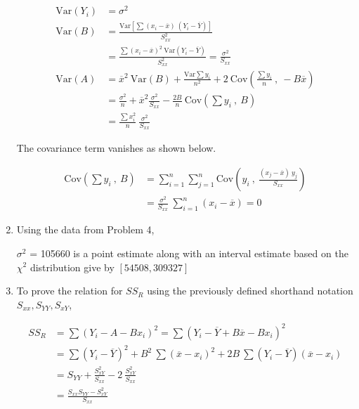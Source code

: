 \begin{enumerate}
\begin{align}
	\mathrm{Var}(Y_i) &= \sigma^2 \nonumber \\
	\mathrm{Var}(B) &= \frac{\mathrm{Var}\left[\sum (x_i - \overline{x})\ (Y_i - \overline{Y})\right]}{S_{xx}^2} \nonumber \\
	&= \frac{\sum (x_i - \overline{x})^2\ \mathrm{Var}(Y_i - \overline{Y})}{S_{xx}^2} = \frac{\sigma^2}{S_{xx}} \\
	\mathrm{Var}(A) &= \overline{x}^2\ \mathrm{Var}(B) + \frac{\mathrm{Var}\sum y_i}{n^2} + 2\ \mathrm{Cov}\left( \frac{\sum y_i}{n}\ ,\  -B \overline{x} \right) \nonumber \\
	&= \frac{\sigma^2}{n} + \overline{x}^2 \frac{\sigma^2}{S_{xx}} - \frac{2B}{n} \ \mathrm{Cov}\left( \sum y_i\ ,\ B \right) \nonumber \\
	&= \frac{\sum x_i^2}{n}\ \frac{\sigma^2}{S_{xx}}
\end{align}

The covariance term vanishes as shown below.

\begin{align}
	\mathrm{Cov}\left( \sum y_i\ ,\ B \right) &= \sum\limits_{i = 1}^{n} \sum\limits_{j = 1}^{n} \mathrm{Cov}\left( y_i\ ,\ \frac{(x_j - \overline{x})\ y_j}{S_{xx}} \right) \nonumber \\
	&= \frac{\sigma^2}{S_{xx}}\ \sum\limits_{i = 1}^{n} (x_i - \overline{x}) = 0
\end{align}


\item Using the data from Problem 4,

$ \sigma^2 $ = 105660 is a point estimate along with an interval estimate based on the $ \chi^2 $ distribution give by $ [54508, 309327] $\\

\item To prove the relation for $ SS_R $ using the previously defined shorthand notation\\
 $ S_{xx}, S_{YY}, S_{xY} $,

\begin{align}
	SS_R &= \sum (Y_i - A - B x_i)^2 = \sum(Y_i - \overline{Y} + B \overline{x} - B x_i)^2 \\
	&= \sum (Y_i - \overline{Y})^2 + B^2\ \sum (\overline{x} - x_i)^2 + 2B\ \sum (Y_i - \overline{Y})(\overline{x} - x_i) \nonumber \\
	&= S_{YY} + \frac{S_{xY}^2}{S_{xx}} - 2\ \frac{S_{xY}^2}{S_{xx}} \nonumber \\
	&= \frac{S_{xx}S_{YY} - S_{xY}^2}{S_{xx}}
\end{align}


\end{enumerate}

